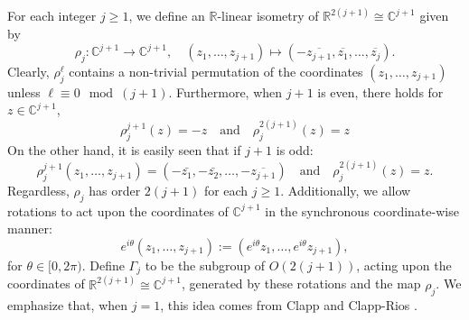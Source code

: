 \documentclass[10pt, reqno]{amsart}
\newcommand{\RR}{\mathbb{R}}
\newcommand{\CC}{\mathbb{C}}
\numberwithin{equation}{section}
\theoremstyle{definition}
\theoremstyle{remark}
\theoremstyle{plain}
\begin{document}
	For each integer $j\ge 1$, we define an $\RR$-linear isometry of $\RR^{2(j+1)} \cong \CC^{j+1}$ given by 
	\begin{equation}
		\rho_{j} : \CC^{j+1} \to \CC^{j+1}, \quad (z_1,\dots, z_{j+1}) \mapsto (-\overline{z_{j+1}}, \overline{z_1}, \dots, \overline{z_{j}}).
	\end{equation}
	Clearly, $\rho_j^\ell$ contains a non-trivial permutation of the coordinates $(z_1,\dots, z_{j+1})$ unless $\ell \equiv 0 \mod{(j+1)}$. Furthermore, when $j+1$ is even, there holds for $z \in \CC^{j+1}$,
	\[
	\rho^{j+1}_{j}(z) = -z \quad \text{and} \quad \rho_j^{2(j+1)}(z) = z
	\]
	On the other hand, it is easily seen that if $j+1$ is odd:
	\[
	\rho^{j+1}_j(z_1,\dots,z_{j+1}) = (-\bar{z_1}, -\bar{z_2},\dots, - \overline{z_{j+1}}) \quad \text{and} \quad \rho^{2(j+1)}_j(z) = z.
	\]
	Regardless, $\rho_j$ has order $2(j+1)$ for each $j \ge 1$. Additionally, we allow rotations to act upon the coordinates of $\CC^{j+1}$ in the synchronous coordinate-wise manner:
	\[
	e^{i\theta}(z_1,\dots,z_{j+1}) := (e^{i\theta} z_1,\dots,e^{i\theta}z_{j+1}),
	\]
	for $\theta \in [0,2\pi)$. Define $\Gamma_j$ to be the subgroup of $O(2(j+1))$, acting upon the coordinates of $\RR^{2(j+1)} \cong \CC^{j+1}$, generated by these rotations and the map $\rho_j$. We emphasize that, when $j=1$, this idea comes from Clapp \cite{Clapp_pure} and Clapp-Rios \cite{clappRios}.
	
\end{document}
